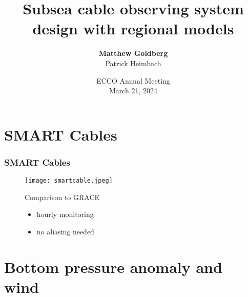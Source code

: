 \documentclass[10pt, aspectratio=169]{oden_beamer}
\begin{document}

\title{Subsea cable observing system design with regional models}
\author{\textbf{Matthew Goldberg}\\
        Patrick Heimbach
}
\date{
    \centering
    ECCO Annual Meeting\\
    March 21, 2024
}

\begin{frame} %
\titlepage
\end{frame}

\section{SMART Cables}
\begin{frame} 

\frametitle{SMART Cables}
\begin{figure}
    \centering
    \begin{minipage}{.4\textwidth}
      \centering
      \texttt{[image: smartcable.jpeg]}
      \label{fig:smartcable}
    \end{minipage}%
    \begin{minipage}{.4\textwidth}
    \begin{block}{Comparison to GRACE}
        \begin{itemize}
            \item hourly monitoring
            \item no aliasing needed
        \end{itemize}
    \end{block}
    \end{minipage}
\end{figure}
\end{frame}

\section{Bottom pressure anomaly and wind} %
\end{document}
